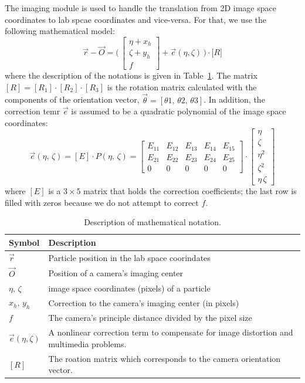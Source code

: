 \documentclass[10pt,a4paper]{article}
\begin{document}
The imaging module is used to handle the translation from 2D image space coordinates to lab spcae coordinates and vice-versa. For that, we use the following mathematical model:
%
\begin{equation}
\vec{r}-\vec{O} = \Big( \, 
\begin{bmatrix}
\eta + x_h\\
\zeta + y_h \\
f
\end{bmatrix}
+ \vec{e}(\eta, \zeta) \,\Big) \cdot \Big[ R \Big]
\label{eq:3dmodel}
\end{equation}
%
where the description of the notations is given in Table~\ref{tab1:mathdesc}. The matrix $[R]= [R_1]\cdot [R_2] \cdot [R_3]$ is the rotation matrix calculated with the components of the orientation vector, $\vec{\theta} = [\theta 1,\, \theta 2,\, \theta 3]$. In addition, the correction temr $\vec{e}$ is assumed to be a quadratic polynomial of the image space coordinates:
%
\begin{equation}
\vec{e}(\eta,\,\zeta) = [E]\cdot P(\eta,\,\zeta) =
\begin{bmatrix}
E_{11} & E_{12} & E_{13} & E_{14} & E_{15}\\
E_{21} & E_{22} & E_{23} & E_{24} & E_{25}\\
0 & 0 & 0 & 0 & 0
\end{bmatrix}
\cdot 
\begin{bmatrix}
\eta\\
\zeta\\
\eta^2\\
\zeta^2\\
\eta\,\zeta
\end{bmatrix}
\end{equation}
%
where $[E]$ is a $3\times5$ matrix that holds the correction coefficients; the last row is filled with zeros because we do not attempt to correct $f$.





\begin{table}
	\centering
	\caption{Description of mathematical notation. \label{tab1:mathdesc}}
	\begin{tabular}{p{5em} p{30em}}
		 \hline
		Symbol & Description \\ \hline
		$\vec{r}$ & Particle position in the lab space coorindates\\
		$\vec{O} $& Position of a camera's imaging center \\
		$\eta, \, \zeta$ & image space coordinates (pixels) of a particle \\
		$x_h , \, y_h$ & Correction to the camera's imaging center (in pixels)\\
		$f$ & The camera's principle distance divided by the pixel size \\ 
		$\vec{e}(\eta, \zeta)$ & A nonlinear correction term to compensate for image distortion and multimedia problems.\\
		$[R]$ & The roation matrix which corresponds to the camera orientation vector. \\  \hline
	\end{tabular}
\end{table}
\end{document}
